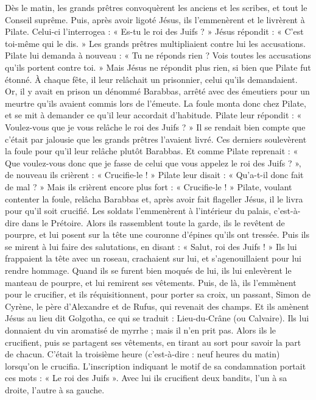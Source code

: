 Dès le matin, les grands prêtres convoquèrent les anciens et les scribes, et tout le Conseil suprême. Puis, après avoir ligoté Jésus, ils l’emmenèrent et le livrèrent à Pilate.
Celui-ci l’interrogea : « Es-tu le roi des Juifs ? » Jésus répondit : « C’est toi-même qui le dis. »
Les grands prêtres multipliaient contre lui les accusations.
Pilate lui demanda à nouveau : « Tu ne réponds rien ? Vois toutes les accusations qu’ils portent contre toi. »
Mais Jésus ne répondit plus rien, si bien que Pilate fut étonné.
À chaque fête, il leur relâchait un prisonnier, celui qu’ils demandaient.
Or, il y avait en prison un dénommé Barabbas, arrêté avec des émeutiers pour un meurtre qu’ils avaient commis lors de l’émeute.
La foule monta donc chez Pilate, et se mit à demander ce qu’il leur accordait d’habitude.
Pilate leur répondit : « Voulez-vous que je vous relâche le roi des Juifs ? »
Il se rendait bien compte que c’était par jalousie que les grands prêtres l’avaient livré.
Ces derniers soulevèrent la foule pour qu’il leur relâche plutôt Barabbas.
Et comme Pilate reprenait : « Que voulez-vous donc que je fasse de celui que vous appelez le roi des Juifs ? »,
de nouveau ils crièrent : « Crucifie-le ! »
Pilate leur disait : « Qu’a-t-il donc fait de mal ? » Mais ils crièrent encore plus fort : « Crucifie-le ! »
Pilate, voulant contenter la foule, relâcha Barabbas et, après avoir fait flageller Jésus, il le livra pour qu’il soit crucifié.
Les soldats l’emmenèrent à l’intérieur du palais, c’est-à-dire dans le Prétoire. Alors ils rassemblent toute la garde,
ils le revêtent de pourpre, et lui posent sur la tête une couronne d’épines qu’ils ont tressée.
Puis ils se mirent à lui faire des salutations, en disant : « Salut, roi des Juifs ! »
Ils lui frappaient la tête avec un roseau, crachaient sur lui, et s’agenouillaient pour lui rendre hommage.
Quand ils se furent bien moqués de lui, ils lui enlevèrent le manteau de pourpre, et lui remirent ses vêtements. Puis, de là, ils l’emmènent pour le crucifier,
et ils réquisitionnent, pour porter sa croix, un passant, Simon de Cyrène, le père d’Alexandre et de Rufus, qui revenait des champs.
Et ils amènent Jésus au lieu dit Golgotha, ce qui se traduit : Lieu-du-Crâne (ou Calvaire).
Ils lui donnaient du vin aromatisé de myrrhe ; mais il n’en prit pas.
Alors ils le crucifient, puis se partagent ses vêtements, en tirant au sort pour savoir la part de chacun.
C’était la troisième heure (c’est-à-dire : neuf heures du matin) lorsqu’on le crucifia.
L’inscription indiquant le motif de sa condamnation portait ces mots : « Le roi des Juifs ».
Avec lui ils crucifient deux bandits, l’un à sa droite, l’autre à sa gauche.
